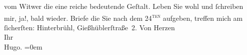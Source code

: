 \begin{ledgroupsized}[t]{13cm}
                    vom Witwer die eine reiche bedeutende
                    Geſtalt. {\pb}Leben Sie wohl und
                    ſchreiben mir, ja!, bald wieder.\pend
           \pstart
           Briefe die Sie nach dem 24\textsuperscript{\textsc{ten}} aufgeben, treffen mich am ſicherſten: Hinterbrühl, Gießhüblerſtraße 2.\pend
           \pstart
           Von Herzen{\\[\baselineskip]}Ihr{\\[\baselineskip]}\spacefill\mbox{Hugo.}\pend
           \leftskip=0em{}
         
         \endnumbering{}\end{ledgroupsized}  \newcommand{\dateiname}{L00825}\newcommand{\titel}{Hugo von Hofmannsthal an Arthur Schnitzler, 19. [7. 1898]}\newcommand{\editorInnen}{Martin Anton Müller und Gerd-Hermann Susen}
      
